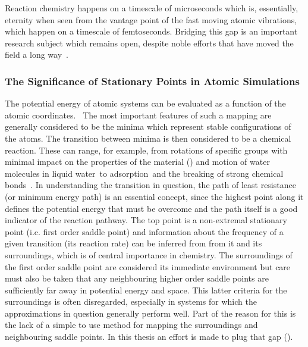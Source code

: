 Reaction chemistry happens on a timescale of microseconds which is, essentially, eternity when seen from the vantage point of the fast moving atomic vibrations, which happen on a timescale of femtoseconds.
Bridging this gap is an important research subject which remains open, despite noble efforts that have moved the field a long way\cite{tst-eyring-1935, tst-polanyi-1935, tst-wigner-1938, htst-wert-1949, htst-vineyard-1957, tst-1990}~\citemiss.


\subsubsection{The Significance of Stationary Points in Atomic Simulations}
The potential energy of atomic systems can be evaluated as a function of the atomic coordinates.~\cite{born-oppenheimer-1927, schrodinger-equation-1926, kohn-1999}
The most important features of such a mapping are generally considered to be the minima which represent stable configurations of the atoms.
The transition between minima is then considered to be a chemical reaction.
These can range, for example, from rotations of specific groups with minimal impact on the properties of the material () and motion of water molecules in liquid water~\citemiss to adsorption~\citemiss and the breaking of strong chemical bonds~\citemiss.
In understanding the transition in question, the path of least resistance (or minimum energy path) is an essential concept, since the highest point along it defines the potential energy that must be overcome and the path itself is a good indicator of the reaction pathway.
The top point is a non-extremal stationary point (i.c. first order saddle point) and information about the frequency of a given transition (its reaction rate) can be inferred from from it and its surroundings, which is of central importance in chemistry.\cite{htst-wert-1949, htst-vineyard-1957}
The surroundings of the first order saddle point are considered its immediate environment but care must also be taken that any neighbouring higher order saddle points are sufficiently far away in potential energy and space.
This latter criteria for the surroundings is often disregarded, especially in systems for which the approximations in question generally perform well.
Part of the reason for this is the lack of a simple to use method for mapping the surroundings and neighbouring saddle points.
In this thesis an effort is made to plug that gap ().


